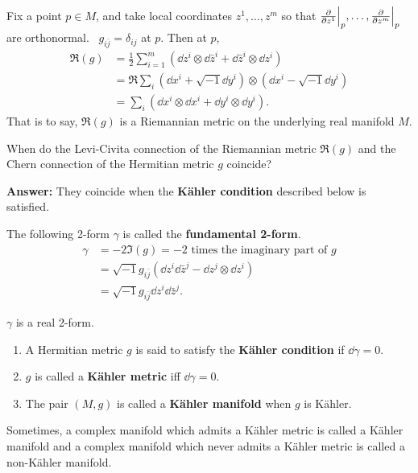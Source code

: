 \documentclass[12pt]{article}
\begin{document}
Fix a point \(p\in M\), and take local coordinates \(z^1,\ldots,z^m\) so that
\(\pdv{}{z^1}\Big|_p,\ldots,\pdv{}{z^m}\Big|_p\) are orthonormal. \ie\ 
\(g_{i\bar{j}}=\delta_{ij}\) at \(p\). Then at \(p\),
\begin{align*}
  \Re(g)&=\frac{1}{2}\sum_{i=1}^{m}(\dd{z^i}\otimes \dd{\bar{z}^i}
  +\dd{\bar{z}^i}\otimes \dd{z^i}) \\
  &=\Re\sum_i (\dd{x^i}+\sqrt{-1}\dd{y^i})\otimes (\dd{x^i}-\sqrt{-1}\dd{y^i}) \\
  &=\sum_i(\dd{x^i}\otimes \dd{x^i}+\dd{y^i}\otimes \dd{y^i})
.\end{align*}
That is to say, \(\Re(g)\) is a Riemannian metric on the underlying real manifold
\(M\).

\begin{question}
  When do the Levi-Civita connection of the Riemannian metric \(\Re(g)\) and the
  Chern connection of the Hermitian metric \(g\) coincide?
\end{question}
\textbf{Answer:} They coincide when the \textbf{K\"ahler condition} described
below is satisfied.

\begin{definition}
  The following 2-form \(\gamma\) is called the \textbf{fundamental 2-form}.
  \begin{align*}
    \gamma&=-2\Im(g)=-2\text{ times the imaginary part of }g \\
    &=\sqrt{-1}g_{i\bar{j}}(\dd{z^i}\dd{\bar{z}^j}-\dd{z^j}\otimes \dd{z^i}) \\
    &=\sqrt{-1}g_{i\bar{j}}\dd{z^i}\dd{\bar{z}^j}
  .\end{align*}
\end{definition}
\begin{remark}
  \(\gamma\) is a real 2-form.
\end{remark}
\begin{definition}
\begin{enumerate}[(1)]
\item A Hermitian metric \(g\) is said to satisfy the \textbf{K\"ahler condition}
  if \(\dd{\gamma}=0\).
\item \(g\) is called a \textbf{K\"ahler metric} iff \(\dd{\gamma}=0\).
\item The pair \((M,g)\) is called a \textbf{K\"ahler manifold} when \(g\) is
  K\"ahler. 
\end{enumerate}
\end{definition}
Sometimes, a complex manifold which admits a K\"ahler metric is called a K\"ahler
manifold and a complex manifold which never admits a K\"ahler metric is called a
non-K\"ahler manifold.
\end{document}
